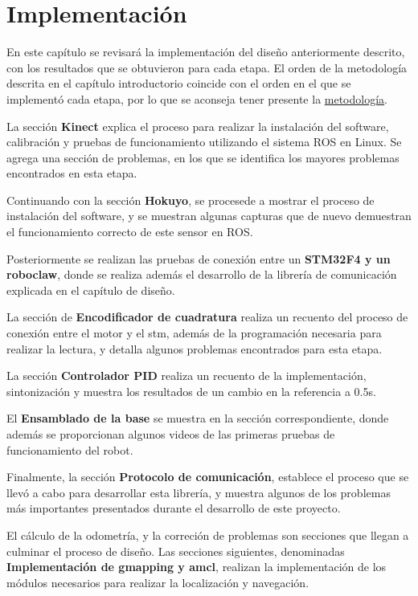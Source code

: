 \chapter{Implementación}

En este capítulo se revisará la implementación del diseño anteriormente descrito, con los resultados que se obtuvieron para cada etapa. El orden de la metodología descrita en el capítulo introductorio coincide con el orden en el que se implementó cada etapa, por lo que se aconseja tener presente la \hyperref[metodología]{metodología}.

La sección \textbf{Kinect} explica el proceso para realizar la instalación del software, calibración y pruebas de funcionamiento utilizando el sistema ROS en Linux. Se agrega una sección de problemas, en los que se identifica los mayores problemas encontrados en esta etapa.

Continuando con la sección \textbf{Hokuyo}, se procesede a mostrar el proceso de instalación del software, y se muestran algunas capturas que de nuevo demuestran el funcionamiento correcto de este sensor en ROS.

Posteriormente se realizan las pruebas de conexión entre un \textbf{STM32F4 y un roboclaw}, donde se realiza además el desarrollo de la librería de comunicación explicada en el capítulo de diseño.

La sección de \textbf{Encodificador de cuadratura} realiza un recuento del proceso de conexión entre el motor y el stm, además de la programación necesaria para realizar la lectura, y detalla algunos problemas encontrados para esta etapa.

La sección \textbf{Controlador PID} realiza un recuento de la implementación, sintonización y muestra los resultados de un cambio en la referencia a 0.5s.

El \textbf{Ensamblado de la base} se muestra en la sección correspondiente, donde además se proporcionan algunos videos de las primeras pruebas de funcionamiento del robot.

Finalmente, la sección \textbf{Protocolo de comunicación}, establece el proceso que se llevó a cabo para desarrollar esta librería, y muestra algunos de los problemas más importantes presentados durante el desarrollo de este proyecto.

El cálculo de la odometría, y la correción de problemas son secciones que llegan a culminar el proceso de diseño. Las secciones siguientes, denominadas \textbf{Implementación de gmapping y amcl}, realizan la implementación de los módulos necesarios para realizar la localización y navegación.

